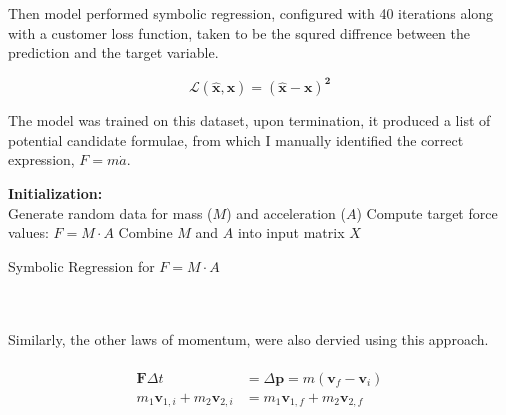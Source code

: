 \documentclass{article}
\begin{document}
Then model performed symbolic regression, configured with 40 iterations along with a customer loss function, taken to be the squred diffrence between the prediction and the target variable. \\ 

\begin{center}
  
  $$
  {\boldsymbol{\mathcal{L}(\hat{x}, x) = (\hat{x} - x)^2}}
$$

\end{center}


The model was trained on this dataset, upon termination, it produced a list of potential candidate formulae, from which I manually identified the correct expression, $F = m \dot a$. \\



\begin{algorithm}[H]
\SetAlgoLined
{}
\textbf{Initialization:} \\
Generate random data for mass (\( M \)) and acceleration (\( A \))\;
Compute target force values: \( F = M \cdot A \)\;
Combine \( M \) and \( A \) into input matrix \( X \)\;

\caption{Symbolic Regression for \( F = M \cdot A \)}
\end{algorithm}

\\
\\

Similarly, the other laws of momentum, were also dervied using this approach. \\ 
\\

\begin{align} \label{eq:impulse_momentum}
\mathbf{F} \Delta t &= \Delta \mathbf{p} = m(\mathbf{v}_f - \mathbf{v}_i) \\
m_1 \mathbf{v}_{1,i} + m_2 \mathbf{v}_{2,i} &= m_1 \mathbf{v}_{1,f} + m_2 \mathbf{v}_{2,f}
\end{align} 
\end{document}
